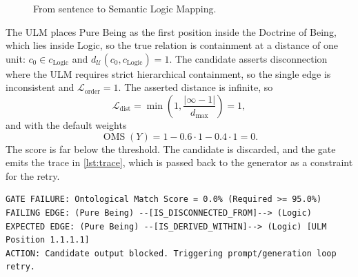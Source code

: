 \documentclass[twocolumn]{ulpaper}
\newcommand{\ULM}{\mathcal{U}}
\newcommand{\OMS}{\operatorname{OMS}}
\newcommand{\Lord}{\mathcal{L}_{\text{order}}}
\newcommand{\Ldist}{\mathcal{L}_{\text{dist}}}
\newcommand{\rel}[1]{\texttt{\small #1}}
\begin{document}
\begin{figure}[t]
\centering
{}
\caption{From sentence to Semantic Logic Mapping.}
\label{fig:parse-chain}
\end{figure}

The ULM places Pure Being as the first position inside the Doctrine of Being, which lies inside Logic, so the true relation is containment at a distance of one unit: $c_0 \in c_{\text{Logic}}$ and $d_\ULM(c_0, c_{\text{Logic}}) = 1$. The candidate asserts disconnection where the ULM requires strict hierarchical containment, so the single edge is inconsistent and $\Lord = 1$. The asserted distance is infinite, so
\begin{equation}
\Ldist = \min\!\left(1, \frac{\lvert \infty - 1 \rvert}{d_{\max}}\right) = 1,
\end{equation}
\noindent and with the default weights
\begin{equation}
\OMS(Y) = 1 - 0.6 \cdot 1 - 0.4 \cdot 1 = 0 .
\end{equation}
\noindent The score is far below the threshold. The candidate is discarded, and the gate emits the trace in \cref{lst:trace}, which is passed back to the generator as a constraint for the retry.

\begin{lstlisting}[language={}, float=*t, caption={Edge-error trace emitted by the gate for the example sentence.}, label={lst:trace}]
GATE FAILURE: Ontological Match Score = 0.0% (Required >= 95.0%)
FAILING EDGE: (Pure Being) --[IS_DISCONNECTED_FROM]--> (Logic)
EXPECTED EDGE: (Pure Being) --[IS_DERIVED_WITHIN]--> (Logic) [ULM Position 1.1.1.1]
ACTION: Candidate output blocked. Triggering prompt/generation loop retry.
\end{lstlisting}
\end{document}
